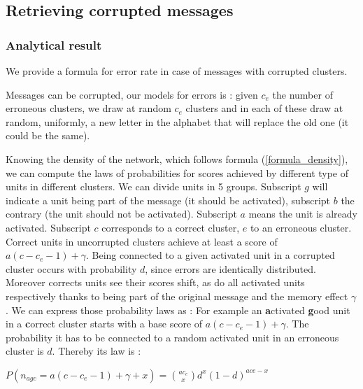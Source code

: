 \documentclass[english,10pt,twocolumn]{IEEEtran}
\theoremstyle{definition}
\begin{document}
	\subsection{Retrieving corrupted messages}
	
	\subsubsection{Analytical result}
%	
%	
%	
%	
%	
	
	We provide a formula for error rate in case of messages with corrupted clusters.

	Messages can be corrupted, our models for errors is : given $c_e$ the number of erroneous clusters, we draw at random $c_e$ clusters and in each of these draw at random, uniformly, a new letter in the alphabet that will replace the old one (it could be the same).
	
	Knowing the density of the network, which follows formula (\ref{formula_density}), we can compute the laws of probabilities for scores achieved by different type of units in different clusters. We can divide units in 5 groups. Subscript $g$ will indicate a unit being part of the message (it should be activated), subscript $b$ the contrary (the unit should not be activated). Subscript $a$ means the unit is already activated. Subscript $c$ corresponds to a correct cluster, $e$ to an erroneous cluster.
	Correct units in uncorrupted clusters achieve at least a score of $a(c-c_e - 1) + \gamma$. 
	Being connected to a given activated unit in a corrupted cluster occurs with probability $d$, since errors are identically distributed. Moreover corrects units see their scores shift, as do all activated units respectively thanks to being part of the original message and the memory effect $\gamma$. We can express those probability laws as : 
	For example an \textbf{a}ctivated \textbf{g}ood unit in a \textbf{c}orrect cluster starts with a base score of $ a(c - c_e - 1) + \gamma$. The probability it has to be connected to a random activated unit in an erroneous cluster is $d$. Thereby its law is :
	
	$P(n_{agc} = a(c - c_e - 1) + \gamma + x) = {a c_e \choose x} d^x (1-d)^{a ce-x}$
	
\end{document}
